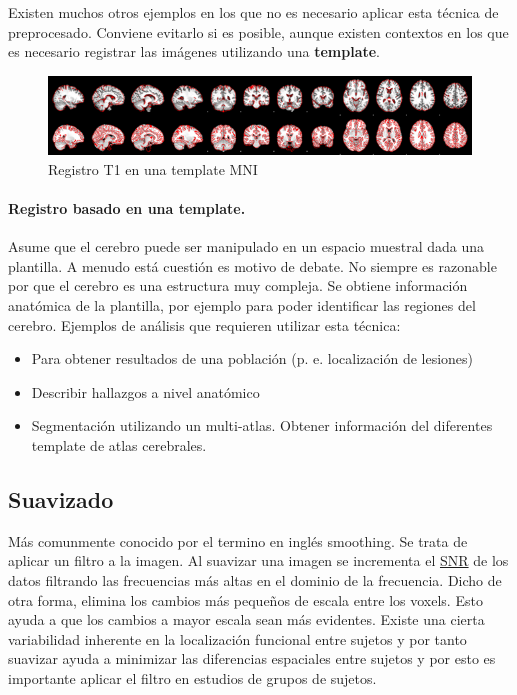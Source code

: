 Existen muchos otros ejemplos en los que no es necesario aplicar esta técnica de preprocesado. Conviene evitarlo si es posible, aunque existen contextos en los que es necesario registrar las imágenes utilizando una \textbf{template}.

\begin{figure}[H]
  \centering
    \includegraphics[scale=0.75]{img/highres2mni.png}
  \caption{ Registro T1 en una template MNI}         \label{preproc:highres2mni}
\end{figure}

\paragraph{ Registro basado en una template.} Asume que el cerebro puede ser manipulado en un espacio muestral dada una plantilla. A menudo está cuestión es motivo de debate. No siempre es razonable por que el cerebro es una estructura muy compleja.
Se obtiene información anatómica de la plantilla, por ejemplo para poder identificar las regiones del cerebro.
Ejemplos de análisis que requieren utilizar esta técnica:
\begin{itemize}
	\item Para obtener resultados de una población (p. e. localización de lesiones)
	\item Describir hallazgos a nivel anatómico
	\item Segmentación utilizando un multi-atlas. Obtener información del diferentes template de atlas cerebrales.
\end{itemize}

\subsection{Suavizado}

Más comunmente conocido por el termino en inglés smoothing. Se trata de aplicar un filtro a la imagen. Al suavizar una imagen se incrementa el \hyperref[glos:snr]{SNR} de los datos filtrando las frecuencias más altas en el dominio de la frecuencia. Dicho de otra forma, elimina los cambios más pequeños de escala entre los voxels. Esto ayuda a que los cambios a mayor escala sean más evidentes. 
Existe una cierta variabilidad inherente en la localización funcional entre sujetos y por tanto suavizar ayuda a minimizar las diferencias espaciales entre sujetos y por esto es importante aplicar el filtro en estudios de grupos de sujetos. \\


